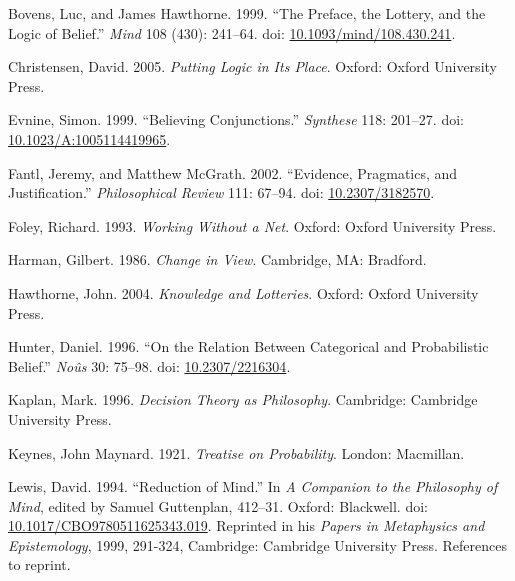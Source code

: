 \documentclass[
  10pt,
  letterpaper,
  DIV=11,
  numbers=noendperiod,
  twoside]{scrartcl}
\newlength{\cslhangindent}
\newenvironment{CSLReferences}[2] %
 {\begin{list}{}{%
  \setlength{\itemindent}{0pt}
  \setlength{\leftmargin}{0pt}
  \setlength{\parsep}{0pt}
  \ifodd #1
   \setlength{\leftmargin}{\cslhangindent}
   \setlength{\itemindent}{-1\cslhangindent}
  \fi
  \setlength{\itemsep}{#2\baselineskip}}}
 {\end{list}}
\begin{document}
\label{refs}
\begin{CSLReferences}{1}{0}
Bovens, Luc, and James Hawthorne. 1999. {``The Preface, the Lottery, and
the Logic of Belief.''} \emph{Mind} 108 (430): 241--64. doi:
\href{https://doi.org/10.1093/mind/108.430.241}{10.1093/mind/108.430.241}.

Christensen, David. 2005. \emph{Putting Logic in Its Place}. Oxford:
Oxford University Press.

Evnine, Simon. 1999. {``Believing Conjunctions.''} \emph{Synthese} 118:
201--27. doi:
\href{https://doi.org/10.1023/A:1005114419965}{10.1023/A:1005114419965}.

Fantl, Jeremy, and Matthew McGrath. 2002. {``Evidence, Pragmatics, and
Justification.''} \emph{Philosophical Review} 111: 67--94. doi:
\href{https://doi.org/10.2307/3182570}{10.2307/3182570}.

Foley, Richard. 1993. \emph{Working Without a Net}. Oxford: Oxford
University Press.

Harman, Gilbert. 1986. \emph{Change in View}. Cambridge, MA: Bradford.

Hawthorne, John. 2004. \emph{Knowledge and Lotteries}. Oxford: Oxford
University Press.

Hunter, Daniel. 1996. {``On the Relation Between Categorical and
Probabilistic Belief.''} \emph{No{û}s} 30: 75--98. doi:
\href{https://doi.org/10.2307/2216304}{10.2307/2216304}.

Kaplan, Mark. 1996. \emph{Decision Theory as Philosophy}. Cambridge:
Cambridge University Press.

Keynes, John Maynard. 1921. \emph{Treatise on Probability}. London:
Macmillan.

Lewis, David. 1994. {``Reduction of Mind.''} In \emph{A Companion to the
Philosophy of Mind}, edited by Samuel Guttenplan, 412--31. Oxford:
Blackwell. doi:
\href{https://doi.org/10.1017/CBO9780511625343.019}{10.1017/CBO9780511625343.019}.
Reprinted in his \emph{Papers in Metaphysics and Epistemology}, 1999,
291-324, Cambridge: Cambridge University Press. References to reprint.


\end{CSLReferences}
\end{document}
